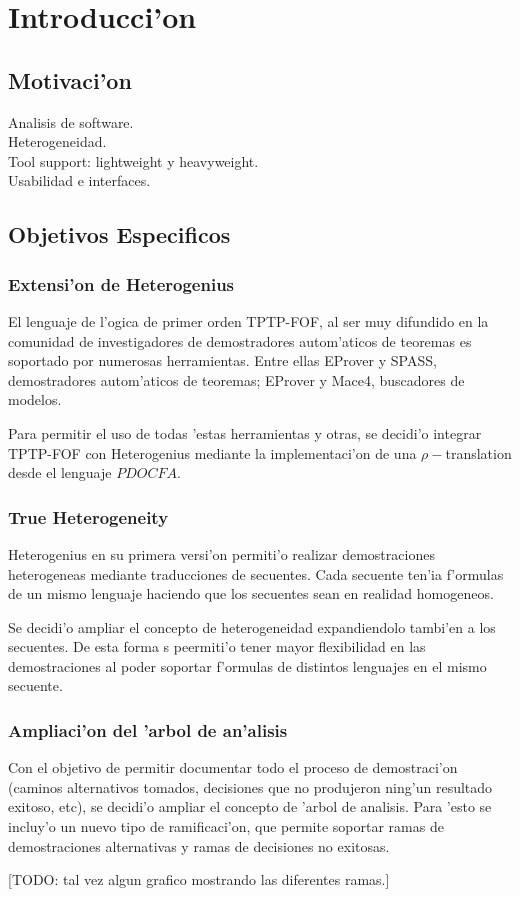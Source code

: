 \chapter{Introducci'on}
\section{Motivaci'on}

Analisis de software. \\
Heterogeneidad. \\
Tool support: lightweight y heavyweight. \\
Usabilidad e interfaces. \\

\section{Objetivos Especificos}

\subsection{Extensi'on de Heterogenius}

El lenguaje de l'ogica de primer orden TPTP-FOF, al ser muy difundido en la comunidad de investigadores de demostradores autom'aticos de teoremas es soportado por numerosas herramientas. Entre ellas EProver y SPASS, demostradores autom'aticos de teoremas; EProver y Mace4, buscadores de modelos. 

Para permitir el uso de todas 'estas herramientas y otras, se decidi'o integrar TPTP-FOF con Heterogenius mediante la implementaci'on de una $\rho-$translation desde el lenguaje $PDOCFA$.

\subsection{True Heterogeneity}

Heterogenius en su primera versi'on permiti'o realizar demostraciones heterogeneas mediante traducciones de secuentes. Cada secuente ten'ia f'ormulas de un mismo lenguaje haciendo que los secuentes sean en realidad homogeneos.

Se decidi'o ampliar el concepto de heterogeneidad expandiendolo tambi'en a los secuentes. De esta forma s peermiti'o tener mayor flexibilidad en las demostraciones al poder soportar f'ormulas de distintos lenguajes en el mismo secuente.

\subsection{Ampliaci'on del 'arbol de an'alisis}

Con el objetivo de permitir documentar todo el proceso de demostraci'on (caminos alternativos tomados, decisiones que no produjeron ning'un resultado exitoso, etc), se decidi'o ampliar el concepto de 'arbol de analisis. Para 'esto se incluy'o un nuevo tipo de ramificaci'on, que permite soportar ramas de demostraciones alternativas y ramas de decisiones no exitosas.

[TODO: tal vez algun grafico mostrando las diferentes ramas.]